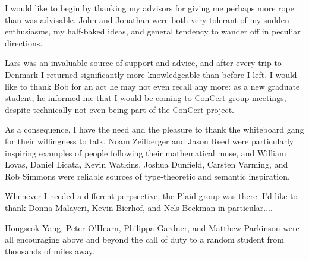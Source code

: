 \documentclass[12pt]{cmuthesis}
\begin{document}
\begin{acknowledgments}
I would like to begin by thanking my advisors for giving me perhaps
more rope than was advisable. John and Jonathan were both very
tolerant of my sudden enthusiasms, my half-baked ideas, and general
tendency to wander off in peculiar directions. 

Lars was an invaluable source of support and advice, and after every
trip to Denmark I returned significantly more knowledgeable than
before I left. I would like to thank Bob for an act he may not even
recall any more: as a new graduate student, he informed me that I
would be coming to ConCert group meetings, despite technically not
even being part of the ConCert project.
 
As a consequence, I have the need and the pleasure to thank the
whiteboard gang for their willingness to talk. Noam Zeilberger and
Jason Reed were particularly inspiring examples of people following
their mathematical muse, and William Lovas, Daniel Licata, Kevin
Watkins, Joshua Dunfield, Carsten Varming, and Rob Simmons were
reliable sources of type-theoretic and semantic inspiration.

Whenever I needed a different perpsective, the Plaid group was
there. I'd like to thank Donna Malayeri, Kevin Bierhof, and Nels
Beckman in particular....


Hongseok Yang, Peter O'Hearn, Philippa Gardner, and Matthew Parkinson
were all encouraging above and beyond the call of duty to a random
student from thousands of miles away. 

\end{acknowledgments}


\tableofcontents
\listoffigures

\mainmatter


%
%
%
%
%
\end{document}
